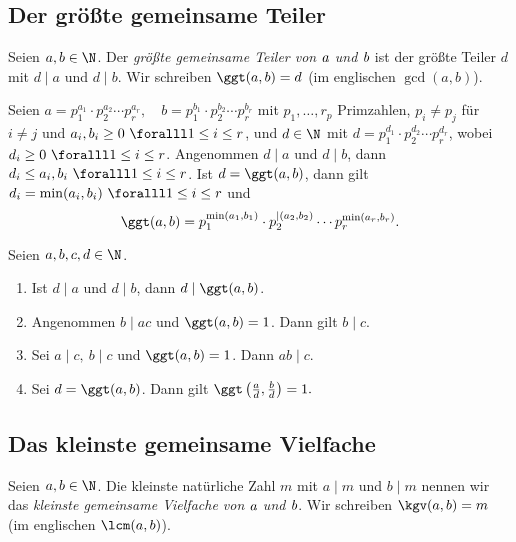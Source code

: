 \subsection*{Der größte gemeinsame Teiler}\video

\begin{defn*}
	Seien $a,b \in \N$. Der \emph{größte gemeinsame Teiler von $\emph{a}$ und $\emph{b}$} ist der größte Teiler $d$ mit $d \mid a$ und $d \mid b$. Wir schreiben $\ggt(a,b) = d$ (im englischen $\gcd(a,b)$).
\end{defn*}

\begin{rem*}
Seien $a = p_1^{a_1} \cdot p_2^{a_2} \dotsm p_r^{a_r},\quad b = p_1^{b_1} \cdot p_2^{b_2} \dotsm p_r^{b_r}$ mit $p_1, \dotsc,r_p$ Primzahlen, $p_i \neq p_j$ für $i \neq j$ und $a_i,b_i \geq 0\ \foralll 1 \leq i \leq r$, und $d \in \N$ mit $ d = p_1^{d_1} \cdot p_2^{d_2} \dotsm p_r^{d_r}$, wobei $d_i \geq 0 \ \foralll 1 \leq i \leq r$. Angenommen $d \mid a$ und $d \mid b$, dann $d_i \leq a_i,b_i \ \foralll 1 \leq i \leq r$. Ist $d = \ggt(a,b)$, dann gilt $d_i = \min(a_i,b_i) \ \foralll 1 \leq i \leq r$ und 
$$\ggt(a,b) = p_1^{\min(a_1,b_1)} \cdot p_2^{\mid(a_2,b_2)} \dotsm p_r^{\min(a_r,b_r)}.$$
\end{rem*}

\begin{lem}\autolabel
	Seien $a,b,c,d \in \N$.
	\begin{enumerate}[label={\roman*})]
		\item Ist $d \mid a$ und $d \mid b$, dann $d \mid \ggt(a,b)$.
		\item Angenommen $b \mid ac$ und $\ggt(a,b) = 1$. Dann gilt $b \mid c$.
		\item Sei $a \mid c,\ b \mid c$ und $\ggt(a,b) = 1$. Dann $ab \mid c$.
		\item Sei $d = \ggt(a,b)$. Dann gilt \( \ggt \left( \frac{a}{d},\frac{b}{d} \right) = 1. \)
	\end{enumerate}
\end{lem}

\subsection*{Das kleinste gemeinsame Vielfache}

\begin{defn*}
	Seien $a,b \in \N$. Die kleinste natürliche Zahl $m$ mit $a \mid m$ und $b \mid m$ nennen wir das \emph{kleinste gemeinsame Vielfache von $\emph{a}$ und $\emph{b}$}. Wir schreiben $\kgv(a,b) = m$ (im englischen $\lcm(a,b)$).
\end{defn*}

